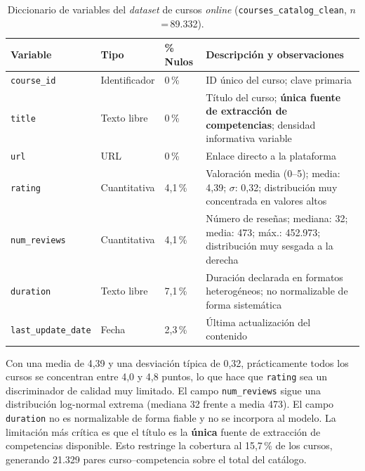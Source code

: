 \begin{table}[H]
  \caption{Diccionario de variables del \textit{dataset} de cursos \textit{online} (\texttt{courses\_catalog\_clean}, $n$\,=\,89.332).}
  \label{tab:vars_cursos}
  \centering
  \footnotesize
  \begin{tabular}{|p{3.5cm}|p{2.2cm}|p{1.5cm}|p{7.0cm}|}
    \hline
    \rowcolor{gray!15}
    \textbf{Variable} & \textbf{Tipo} & \textbf{\% Nulos} & \textbf{Descripción y observaciones} \\
    \hline
    \texttt{course\_id}         & Identificador  & 0\,\%   & ID único del curso; clave primaria \\
    \hline
    \texttt{title}              & Texto libre    & 0\,\%   & Título del curso; \textbf{única fuente de extracción de competencias}; densidad informativa variable \\
    \hline
    \texttt{url}                & URL            & 0\,\%   & Enlace directo a la plataforma \\
    \hline
    \texttt{rating}             & Cuantitativa   & 4,1\,\% & Valoración media (0--5); media: 4,39; $\sigma$: 0,32; distribución muy concentrada en valores altos \\
    \hline
    \texttt{num\_reviews}       & Cuantitativa   & 4,1\,\% & Número de reseñas; mediana: 32; media: 473; máx.: 452.973; distribución muy sesgada a la derecha \\
    \hline
    \texttt{duration}           & Texto libre    & 7,1\,\% & Duración declarada en formatos heterogéneos; no normalizable de forma sistemática \\
    \hline
    \texttt{last\_update\_date} & Fecha          & 2,3\,\% & Última actualización del contenido \\
    \hline
  \end{tabular}
\end{table}

Con una media de 4,39 y una desviación típica de 0,32, prácticamente todos los cursos se concentran entre 4,0 y 4,8 puntos, lo que hace que \texttt{rating} sea un discriminador de calidad muy limitado. El campo \texttt{num\_reviews} sigue una distribución log-normal extrema (mediana 32 frente a media 473). El campo \texttt{duration} no es normalizable de forma fiable y no se incorpora al modelo. La limitación más crítica es que el título es la \textbf{única} fuente de extracción de competencias disponible. Esto restringe la cobertura al 15,7\,\% de los cursos, generando 21.329 pares curso--competencia sobre el total del catálogo.

